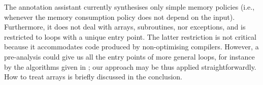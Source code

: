 


The annotation assistant currently synthesises only simple memory
policies (i.e., whenever the memory consumption policy does not depend
on the input).  Furthermore, it does not deal with arrays,
subroutines, nor exceptions, and is restricted to loops with a unique
entry point. The latter restriction is not critical because it
accommodates code produced by non-optimising compilers. However, a
pre-analysis could give us all the entry points of more general loops,
for instance by the algorithms given in \cite{CJPS05cmu}; our approach
may be thus applied straightforwardly. How to treat arrays is
briefly discussed in the conclusion.




